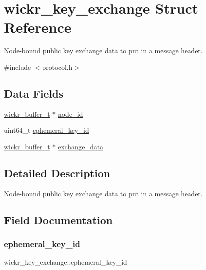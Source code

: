 \hypertarget{structwickr__key__exchange}{}\section{wickr\+\_\+key\+\_\+exchange Struct Reference}
\label{structwickr__key__exchange}


Node-\/bound public key exchange data to put in a message header.  




{\ttfamily \#include $<$protocol.\+h$>$}

\subsection*{Data Fields}
\begin{DoxyCompactItemize}
\item 
\mbox{\hyperlink{structwickr__buffer}{wickr\+\_\+buffer\+\_\+t}} $\ast$ \mbox{\hyperlink{structwickr__key__exchange_ad5b271c9c3cf2043ec85dbb40c51fec6}{node\+\_\+id}}
\item 
uint64\+\_\+t \mbox{\hyperlink{structwickr__key__exchange_aa400c601e6a24cdffeb627501d36cd3e}{ephemeral\+\_\+key\+\_\+id}}
\item 
\mbox{\hyperlink{structwickr__buffer}{wickr\+\_\+buffer\+\_\+t}} $\ast$ \mbox{\hyperlink{structwickr__key__exchange_a6be89562df814a32b19cd57c49037691}{exchange\+\_\+data}}
\end{DoxyCompactItemize}


\subsection{Detailed Description}
Node-\/bound public key exchange data to put in a message header. 

\subsection{Field Documentation}
\mbox{\label{structwickr__key__exchange_aa400c601e6a24cdffeb627501d36cd3e}} 
\subsubsection{\texorpdfstring{ephemeral\+\_\+key\+\_\+id}{ephemeral\_key\_id}}
{\footnotesize\ttfamily wickr\+\_\+key\+\_\+exchange\+::ephemeral\+\_\+key\+\_\+id}

